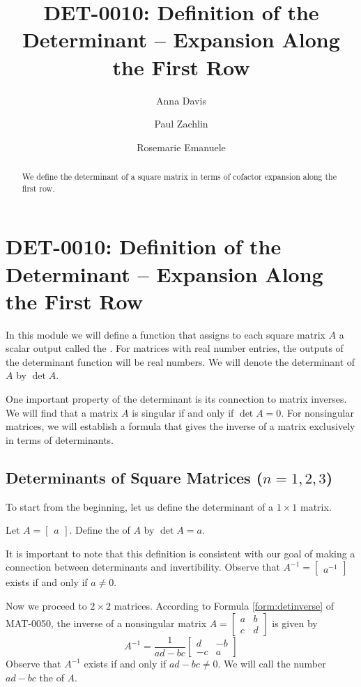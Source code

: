 \documentclass{ximera}
\author{Anna Davis \and Paul Zachlin \and Rosemarie Emanuele} \title{DET-0010: Definition of the Determinant -- Expansion Along the First Row} \license{CC-BY 4.0}
\begin{document}
\begin{abstract}
 We define the determinant of a square matrix in terms of cofactor expansion along the first row.
\end{abstract}
\maketitle

\section*{DET-0010: Definition of the Determinant -- Expansion Along the First Row}
In this module we will define a function that assigns to each square matrix $A$ a scalar output called the .  For matrices with real number entries, the outputs of the determinant function will be real numbers.  We will denote the determinant of $A$ by $\det{A}$.  

One important property of the determinant is its connection to matrix inverses.  We will find that a matrix $A$ is singular if and only if $\det{A}=0$.  For nonsingular matrices, we will establish a formula that gives the inverse of a matrix exclusively in terms of determinants.

\subsection*{Determinants of Square Matrices ($n=1,2,3$)}
To start from the beginning, let us define the determinant of a $1\times 1$ matrix.
\begin{definition}\label{def:onebyonedet} Let
$A=\begin{bmatrix}a\end{bmatrix}$.  Define the  of $A$ by $\det{A}=a$.
\end{definition}
It is important to note that this definition is consistent with our goal of making a connection between determinants and invertibility.  Observe that $A^{-1}=\begin{bmatrix}a^{-1}\end{bmatrix}$ exists if and only if $a\neq 0$.

Now we proceed to $2\times 2$ matrices.  According to Formula \ref{form:detinverse} of MAT-0050, the inverse of a nonsingular matrix $A=\begin{bmatrix}a&b\\c&d\end{bmatrix}$ is given by
$$A^{-1}=\frac{1}{ad-bc}\begin{bmatrix}d&-b\\-c&a\end{bmatrix}$$
Observe that $A^{-1}$ exists if and only if $ad-bc\neq 0$.  We will call the number $ad-bc$ the  of $A$.
\end{document}
